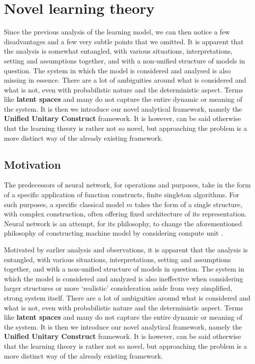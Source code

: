 \chapter{Novel learning theory}
Since the previous analysis of the learning model, we can then notice a few disadvantages and a few very subtle points that we omitted. It is apparent that the analysis is somewhat entangled, with various situations, interpretations, setting and assumptions together, and with a non-unified structure of models in question. The system in which the model is considered and analysed is also missing in essence. There are a lot of ambiguities around what is considered and what is not, even with probabilistic nature and the deterministic aspect. Terms like \textbf{latent spaces} and many do not capture the entire dynamic or meaning of the system. It is then we introduce our novel analytical framework, namely the \textbf{Unified Unitary Construct} framework. It is however, can be said otherwise that the learning theory is rather not so novel, but approaching the problem is a more distinct way of the already existing framework. 
\section{Motivation}
The predecessors of neural network, for operations and purposes, take in the form of a specific application of function constructs, finite singleton algorithms. For such purposes, a specific classical model $m$ takes the form of a single structure, with complex construction, often offering fixed architecture of its representation. Neural network is an attempt, for its philosophy, to change the aforementioned philosophy of constructing machine model by considering compute unit \cite{mcculloch_logical_1943,Rosenblatt1958ThePA}. 

Motivated by earlier analysis and observations, it is apparent that the analysis is entangled, with various situations, interpretations, setting and assumptions together, and with a non-unified structure of models in question. The system in which the model is considered and analyzed is also ineffective when considering larger structures or more `realistic' consideration aside from very simplified, strong system itself. There are a lot of ambiguities around what is considered and what is not, even with probabilistic nature and the deterministic aspect. Terms like \textbf{latent spaces} and many do not capture the entire dynamic or meaning of the system. It is then we introduce our novel analytical framework, namely the \textbf{Unified Unitary Construct} framework. It is however, can be said otherwise that the learning theory is rather not so novel, but approaching the problem is a more distinct way of the already existing framework. 

